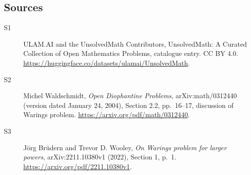 \documentclass[11pt]{article}
\begin{document}
\subsection{Sources}
\begin{description}
\item[\hypertarget{source:statement:1}{S1}] ULAM.AI and the UnsolvedMath Contributors, UnsolvedMath: A Curated Collection of Open Mathematics Problems, catalogue entry. CC BY 4.0. \url{https://huggingface.co/datasets/ulamai/UnsolvedMath}.
\item[\hypertarget{source:statement:2}{S2}] Michel Waldschmidt, \emph{Open Diophantine Problems}, arXiv:math/0312440 (version dated January 24, 2004), Section 2.2, pp.\ 16--17, discussion of Waring\textquotesingle s problem. \url{https://arxiv.org/pdf/math/0312440}.
\item[\hypertarget{source:statement:3}{S3}] J\"org Br\"udern and Trevor D. Wooley, \emph{On Waring\textquotesingle s problem for larger powers}, arXiv:2211.10380v1 (2022), Section 1, p.\ 1. \url{https://arxiv.org/pdf/2211.10380v1}.
\end{description}
\label{end:statement}
\end{document}
